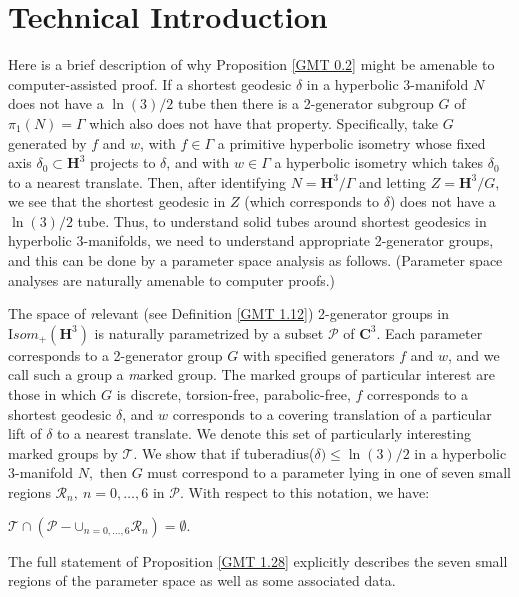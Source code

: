 \chapter{Technical Introduction}\label{Ch. Technical Introduction}
Here is a brief description of why Proposition \ref{GMT 0.2} might be amenable to 
computer-assisted proof.
If a shortest geodesic $\delta$ in a hyperbolic $3$-manifold $N$ does not have 
a $\ln(3)/2$
tube then there is a 2-generator subgroup $G$ of $\pi_1(N) = \Gamma$
which also does not have that property.
Specifically, take $G$ generated by $f$ and $w$,
with $f \in \Gamma$ a primitive hyperbolic isometry
whose fixed axis $\delta_0 \subset {\mathbf H}^3$ projects to $\delta$, and 
with $w \in \Gamma$ a hyperbolic isometry
which takes $\delta_0$ to a nearest translate.
Then, after identifying $N={\mathbf H}^3/\Gamma$ and letting 
$Z={\mathbf H}^3/G$,
we see that the shortest geodesic in $Z$ (which corresponds to $\delta$)
does not have 
a $\ln(3)/2$ tube. 
Thus, to understand solid tubes around shortest geodesics in hyperbolic 
$3$-manifolds, we need to understand appropriate 2-generator groups, and this 
can be done by a parameter space analysis as follows.  (Parameter space 
analyses are naturally amenable to 
computer proofs.)

The space of {\textit relevant}
(see
Definition \ref{GMT 1.12})
2-generator groups 
in ${\mathrm Isom}_+({\mathbf H}^3)$ is naturally
parametrized by a subset ${\mathcal P}$ of ${\mathbf C}^3.$  
Each parameter corresponds to a
2-generator group $G$ with specified generators $f$ and $w$, and we call 
such a group a {\textit marked group}. 
The marked groups of particular interest are those in which $G$ is
discrete, torsion-free, parabolic-free, $f$ corresponds to a shortest
geodesic $\delta$, and $w$ corresponds to a
covering translation of a particular lift of
$\delta$ to a nearest translate.  
We denote this set of particularly interesting marked groups by ${\mathcal T}.$
We show that if tuberadius($\delta) \le \ln(3)/2$ 
in a hyperbolic $3$-manifold $N,$ then 
$G$ must correspond to a parameter lying in one of seven small regions
${\mathcal R}_n,\ n=0,\ldots,6$ 
in ${\mathcal P}$.  
With respect to this notation, we have:

\begin{proposition} \label{GMT 1.28}
${\mathcal T} \cap ({\mathcal P} - \mathbf{\cup}_{n=0,\ldots,6}{\mathcal R}_n) = \emptyset.$
\vfill\end{proposition}

The full statement of Proposition \ref{GMT 1.28}
explicitly describes the seven small
regions of the parameter space as well as some associated data.

